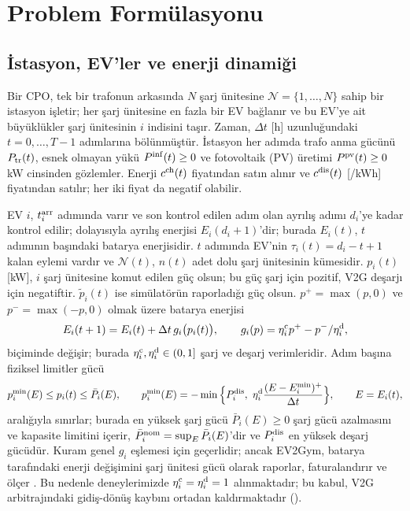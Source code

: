 \section{Problem Formülasyonu}\label{sec:problem}

\subsection{İstasyon, EV'ler ve enerji dinamiği}\label{sec:station}

Bir CPO, tek bir trafonun arkasında $N$ şarj ünitesine $\mathcal N=\{1,\dots,N\}$ sahip bir istasyon işletir; her şarj ünitesine en fazla bir EV bağlanır ve bu EV'ye ait büyüklükler şarj ünitesinin $i$ indisini taşır.
Zaman, $\Delta t$ [h] uzunluğundaki $t=0,\dots,T-1$ adımlarına bölünmüştür.
İstasyon her adımda trafo anma gücünü $P_{\mathrm{tr}}(t)$, esnek olmayan yükü $P^{\mathrm{inf}}(t)\ge0$ ve fotovoltaik (PV) üretimi $P^{\mathrm{pv}}(t)\ge0$ kW cinsinden gözlemler.
Enerji $c^{\mathrm{ch}}(t)$ fiyatından satın alınır ve $c^{\mathrm{dis}}(t)$ [\texteuro/kWh] fiyatından satılır; her iki fiyat da negatif olabilir.

EV $i$, $t_i^{\mathrm{arr}}$ adımında varır ve son kontrol edilen adım olan ayrılış adımı $d_i$'ye kadar kontrol edilir; dolayısıyla ayrılış enerjisi $E_i(d_i+1)$'dir; burada $E_i(t)$, $t$ adımının başındaki batarya enerjisidir.
$t$ adımında EV'nin $\tau_i(t)=d_i-t+1$ kalan eylemi vardır ve $\mathcal N(t)$, $n(t)$ adet dolu şarj ünitesinin kümesidir.
$p_i(t)$ [kW], $i$ şarj ünitesine komut edilen güç olsun; bu güç şarj için pozitif, V2G deşarjı için negatiftir. $\tilde p_i(t)$ ise simülatörün raporladığı güç olsun.
$p^{+}=\max(p,0)$ ve $p^{-}=\max(-p,0)$ olmak üzere batarya enerjisi
\begin{equation}\label{eq:dynamics}
E_i(t+1)=E_i(t)+\Delta t\,g_i\big(p_i(t)\big),\qquad g_i(p)=\eta_i^{\mathrm c}p^{+}-p^{-}/\eta_i^{\mathrm d},
\end{equation}
biçiminde değişir; burada $\eta_i^{\mathrm c},\eta_i^{\mathrm d}\in(0,1]$ şarj ve deşarj verimleridir.
Adım başına fiziksel limitler gücü
\begin{equation}\label{eq:limits}
\pmn_i(E)\le p_i(t)\le \bar P_i(E),\qquad \pmn_i(E)=-\min\Big\{\Pdis_i,\ \eta_i^{\sm d}\frac{(E-E_i^{\min})^{+}}{\Delta t}\Big\},\qquad E=E_i(t),
\end{equation}
aralığıyla sınırlar; burada en yüksek şarj gücü $\bar P_i(E)\ge0$ şarj gücü azalmasını ve kapasite limitini içerir, $\bar P^{\mathrm{nom}}_i=\sup_E\bar P_i(E)$'dir ve $P^{\mathrm{dis}}_i$ en yüksek deşarj gücüdür.
Kuram genel $g_i$ eşlemesi için geçerlidir; ancak EV2Gym, batarya tarafındaki enerji değişimini şarj ünitesi gücü olarak raporlar, faturalandırır ve ölçer \cite{orfanoudakis2025ev2gym}.
Bu nedenle deneylerimizde $\eta_i^{\mathrm c}=\eta_i^{\mathrm d}=1$ alınmaktadır; bu kabul, V2G arbitrajındaki gidiş-dönüş kaybını ortadan kaldırmaktadır ().

